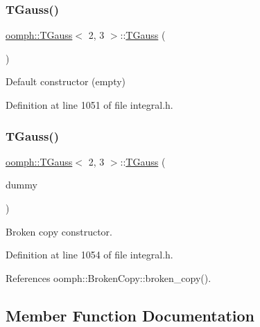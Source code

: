 \subsubsection{\texorpdfstring{T\+Gauss()}{TGauss()}\hspace{0.1cm}{\footnotesize\ttfamily [1/2]}}
{\footnotesize\ttfamily \hyperlink{classoomph_1_1TGauss}{oomph\+::\+T\+Gauss}$<$ 2, 3 $>$\+::\hyperlink{classoomph_1_1TGauss}{T\+Gauss} (\begin{DoxyParamCaption}{ }\end{DoxyParamCaption})\hspace{0.3cm}{\ttfamily [inline]}}



Default constructor (empty) 



Definition at line 1051 of file integral.\+h.

\mbox{\label{classoomph_1_1TGauss_3_012_00_013_01_4_a957346442d04ff2374e1abde79824f66}} 
\subsubsection{\texorpdfstring{T\+Gauss()}{TGauss()}\hspace{0.1cm}{\footnotesize\ttfamily [2/2]}}
{\footnotesize\ttfamily \hyperlink{classoomph_1_1TGauss}{oomph\+::\+T\+Gauss}$<$ 2, 3 $>$\+::\hyperlink{classoomph_1_1TGauss}{T\+Gauss} (\begin{DoxyParamCaption}\item[{const \hyperlink{classoomph_1_1TGauss}{T\+Gauss}$<$ 2, 3 $>$ \&}]{dummy }\end{DoxyParamCaption})\hspace{0.3cm}{\ttfamily [inline]}}



Broken copy constructor. 



Definition at line 1054 of file integral.\+h.



References oomph\+::\+Broken\+Copy\+::broken\+\_\+copy().



\subsection{Member Function Documentation}
\mbox{\label{classoomph_1_1TGauss_3_012_00_013_01_4_a5d3b89484786370de197acc1f555fbea}} 
